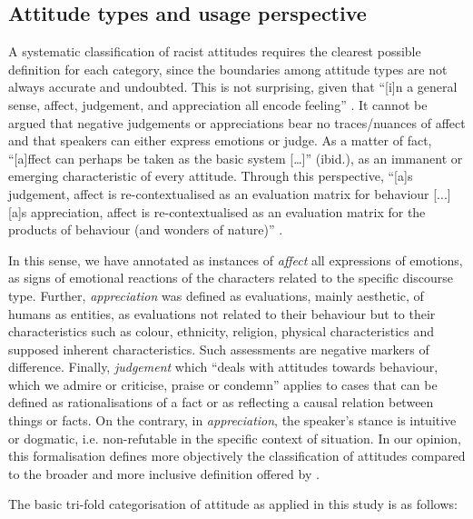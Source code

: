 \documentclass[output=paper]{LSP/langsci}
\begin{document}
\subsection{Attitude types and usage perspective} \label{sec:2:4:2}

A systematic classification of racist attitudes requires the clearest possible definition for each category, since the boundaries among attitude types are not always accurate and undoubted. This is not surprising, given that “[i]n a general sense, affect, judgement, and appreciation all encode feeling” \citep[147]{Martin2000}. It cannot be argued that negative judgements or appreciations bear no traces/nuances of affect and that speakers can either express emotions or judge. As a matter of fact, “[a]ffect can perhaps be taken as the basic system […]” (ibid.), as an immanent or emerging characteristic of every attitude. Through this perspective, “[a]s judgement, affect is re-contextualised as an evaluation matrix for behaviour [...] [a]s appreciation, affect is re-contextualised as an evaluation matrix for the products of behaviour (and wonders of nature)” \citep[147]{Martin2000}.

In this sense, we have annotated as instances of \textit{affect} all expressions of emotions, as signs of emotional reactions of the characters related to the specific discourse type. Further, \textit{appreciation} was defined as evaluations, mainly aesthetic, of humans as entities, as evaluations not related to their behaviour but to their characteristics such as colour, ethnicity, religion, physical characteristics and supposed inherent characteristics. Such assessments are negative markers of difference. Finally, \textit{judgement} which “deals with attitudes towards behaviour, which we admire or criticise, praise or condemn” \citep[42]{MartinWhite2005} applies to cases that can be defined as rationalisations of a fact or as reflecting a causal relation between things or facts. On the contrary, in \textit{appreciation}, the speaker's stance is intuitive or dogmatic, i.e. non-refutable in the specific context of situation. In our opinion, this formalisation defines more objectively the classification of attitudes compared to the broader and more inclusive definition offered by \citet[42--45]{MartinWhite2005}.

The basic tri-fold categorisation of attitude as applied in this study is as follows:
\end{document}
